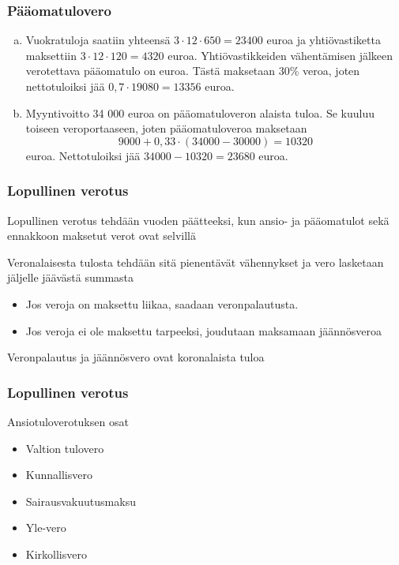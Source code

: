 \documentclass[handout]{beamer}
\begin{document}
\begin{frame}
\frametitle{Pääomatulovero}
	\begin{ratkaisu}
		\begin{enumerate}[(a)]
			\item Vuokratuloja saatiin yhteensä \pause \(3\cdot12\cdot650 = 23 400\) euroa ja yhtiövastiketta maksettiin \pause  \(3\cdot12\cdot120 = 4320\) euroa. \pause Yhtiövastikkeiden vähentämisen jälkeen verotettava pääomatulo on  euroa. Tästä maksetaan 30\% veroa, joten nettotuloiksi jää \pause \(0,7\cdot19080=13356\) euroa.\pause
			\item Myyntivoitto 34 000 euroa on pääomatuloveron alaista tuloa. \pause Se kuuluu toiseen veroportaaseen, joten pääomatuloveroa maksetaan\pause
			\[
				9000 + 0,33\cdot(34000-30000) = 10320
			\]
			euroa. \pause Nettotuloiksi jää \(34 000-10320 = 23680\) euroa.
		\end{enumerate}
		
	\end{ratkaisu}
\end{frame}

\begin{frame}
\frametitle{Lopullinen verotus}
\pause
Lopullinen verotus tehdään vuoden päätteeksi, kun ansio- ja pääomatulot sekä ennakkoon maksetut verot ovat selvillä
\begin{block}{}
Veronalaisesta tulosta tehdään sitä pienentävät vähennykset ja vero lasketaan jäljelle jäävästä summasta 
	\begin{itemize}
		\item Jos veroja on maksettu liikaa, saadaan veronpalautusta.
		\item Jos veroja ei ole maksettu tarpeeksi, joudutaan maksamaan jäännösveroa
	\end{itemize}
\end{block}
\pause
Veronpalautus ja jäännösvero ovat koronalaista tuloa
\end{frame}

\begin{frame}
\frametitle{Lopullinen verotus}
\begin{block}{Ansiotuloverotuksen osat}
	\begin{itemize}
		\item Valtion tulovero
		\item Kunnallisvero
		\item Sairausvakuutusmaksu
		\item Yle-vero
		\item Kirkollisvero
	\end{itemize}
\end{block}

\end{frame}
\end{document}
